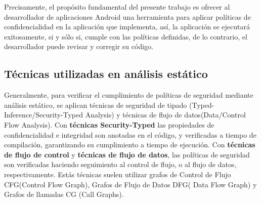 Precisamente, el propósito fundamental del presente trabajo es ofrecer al
desarrollador de aplicaciones Android una herramienta para aplicar políticas de
confidencialidad en la aplicación que implementa, así, la aplicación se
ejecutará exitosamente, si y sólo si, cumple con las políticas definidas, de lo
contrario, el desarrollador puede revisar y corregir su código.\newline
 
\subsection{Técnicas utilizadas en análisis estático } 
Generalmente, para verificar el cumplimiento de políticas de seguridad mediante
análisis estático, se aplican técnicas de seguridad de tipado
(Typed-Inference/Security-Typed Analysis) y técnicas de flujo de
datos(Data/Control Flow Analysis)\cite{Information-Flow-Java}.\newline 
Con \textbf{técnicas Security-Typed} las propiedades de confidencialidad e
integridad son anotadas en el código, y verificadas a tiempo de compilación,
garantizando su cumplimiento a tiempo de ejecución.\newline 
Con \textbf{técnicas de flujo de control} y \textbf{técnicas de flujo de datos},
las políticas de seguridad son verificadas haciendo seguimiento al control de
flujo, o al flujo de datos, respectivamente. Estás técnicas suelen utilizar
grafos de Control de Flujo CFG(Control Flow Graph), Grafos de Flujo de Datos
DFG( Data Flow Graph) y Grafos de llamadas CG (Call Graphs).

